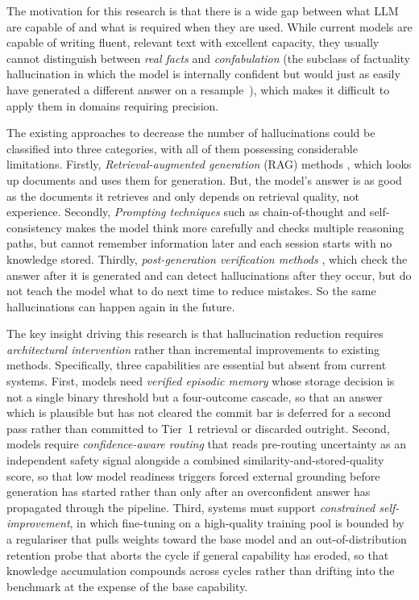 The motivation for this research is that there is a wide gap between what LLM are capable of and what is required when they are used. While current models are capable of writing fluent, relevant text with excellent capacity, they usually cannot distinguish between \textit{real facts} and \textit{confabulation} (the subclass of factuality hallucination in which the model is internally confident but would just as easily have generated a different answer on a resample~\cite{farquhar2024semantic}), which makes it difficult to apply them in domains requiring precision.

The existing approaches to decrease the number of hallucinations could be classified into three categories, with all of them possessing considerable limitations. Firstly, \textit{Retrieval-augmented generation} (RAG) methods \cite{NEURIPS2020_6b493230}, which looks up documents and uses them for generation. But, the model's answer is as good as the documents it retrieves and only depends on retrieval quality, not experience. Secondly, \textit{Prompting techniques} such as chain-of-thought \cite{NEURIPS2022_9d560961} and self-consistency \cite{wang2023selfconsistency} makes the model think more carefully and checks multiple reasoning paths, but cannot remember information later and each session starts with no knowledge stored. Thirdly, \textit{post-generation verification methods} \cite{manakul-etal-2023-selfcheckgpt, farquhar2024semantic}, which check the answer after it is generated and can detect hallucinations after they occur, but do not teach the model what to do next time to reduce mistakes. So the same hallucinations can happen again in the future.

The key insight driving this research is that hallucination reduction requires \textit{architectural intervention} rather than incremental improvements to existing methods. Specifically, three capabilities are essential but absent from current systems. First, models need \textit{verified episodic memory} whose storage decision is not a single binary threshold but a four-outcome cascade, so that an answer which is plausible but has not cleared the commit bar is deferred for a second pass rather than committed to Tier~1 retrieval or discarded outright. Second, models require \textit{confidence-aware routing} that reads pre-routing uncertainty as an independent safety signal alongside a combined similarity-and-stored-quality score, so that low model readiness triggers forced external grounding before generation has started rather than only after an overconfident answer has propagated through the pipeline. Third, systems must support \textit{constrained self-improvement}, in which fine-tuning on a high-quality training pool is bounded by a regulariser that pulls weights toward the base model and an out-of-distribution retention probe that aborts the cycle if general capability has eroded, so that knowledge accumulation compounds across cycles rather than drifting into the benchmark at the expense of the base capability.

